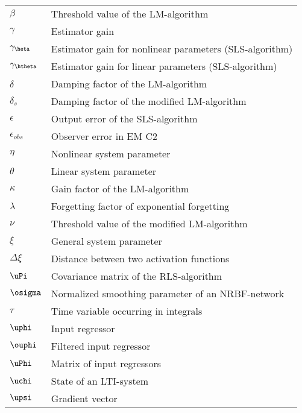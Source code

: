 \begin{longtable}[l]{ll}
$\beta$												& Threshold value of the LM-algorithm\\
$\gamma$											& Estimator gain\\
$\gamma_{\heta}$							& Estimator gain for nonlinear parameters (SLS-algorithm)\\
$\gamma_{\htheta}$						& Estimator gain for linear parameters (SLS-algorithm)\\
$\delta$        							& Damping factor of the LM-algorithm\\
$\delta_s$      					    & Damping factor of the modified LM-algorithm\\
$\epsilon$								    & Output error of the SLS-algorithm\\
$\epsilon_{obs}$							& Observer error in EM C2\\
$\eta$      									& Nonlinear system parameter\\
$\theta$   							  		& Linear system parameter\\
$\kappa$											& Gain factor of the LM-algorithm\\
$\lambda$											& Forgetting factor of exponential forgetting\\
$\nu$													& Threshold value of the modified LM-algorithm\\
$\xi$       									& General system parameter \\
$\Delta \xi$					    		& Distance between two activation functions\\
$\uPi$												& Covariance matrix of the RLS-algorithm\\
$\osigma$							    		& Normalized smoothing parameter of an NRBF-network\\
$\tau$												& Time variable occurring in integrals\\
$\uphi$ 	      							& Input regressor\\
$\ouphi$											& Filtered input regressor\\
$\uPhi$												& Matrix of input regressors\\
$\uchi$     									& State of an LTI-system\\
$\upsi$												& Gradient vector\\
\end{longtable}

